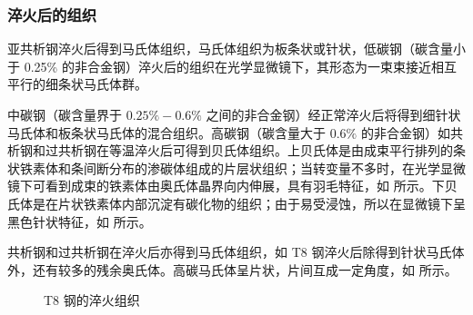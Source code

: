 \documentclass[a4paper,utf8]{article}
\begin{document}
        \subsubsection{淬火后的组织}
            亚共析钢淬火后得到马氏体组织，马氏体组织为板条状或针状，低碳钢（碳含量小于 0.25\% 的非合金钢）淬火后的组织在光学显微镜下，其形态为一束束接近相互平行的细条状马氏体群。\par
            中碳钢（碳含量界于 $0.25\%-0.6\%$ 之间的非合金钢）经正常淬火后将得到细针状马氏体和板条状马氏体的混合组织。高碳钢（碳含量大于 $0.6\%$ 的非合金钢）如共析钢和过共析钢在等温淬火后可得到贝氏体组织。上贝氏体是由成束平行排列的条状铁素体和条间断分布的渗碳体组成的片层状组织；当转变量不多时，在光学显微镜下可看到成束的铁素体由奥氏体晶界向内伸展，具有羽毛特征，如 所示。下贝氏体是在片状铁素体内部沉淀有碳化物的组织；由于易受浸蚀，所以在显微镜下呈黑色针状特征，如 所示。\par
            共析钢和过共析钢在淬火后亦得到马氏体组织，如 T8 钢淬火后除得到针状马氏体外，还有较多的残余奥氏体。高碳马氏体呈片状，片间互成一定角度，如 所示。
            \begin{figure}[!ht]
                \centering
                \hspace{20pt}
                \hspace{20pt}
                \caption{T8 钢的淬火组织\label{fig:2}}
            \end{figure}
\end{document}
